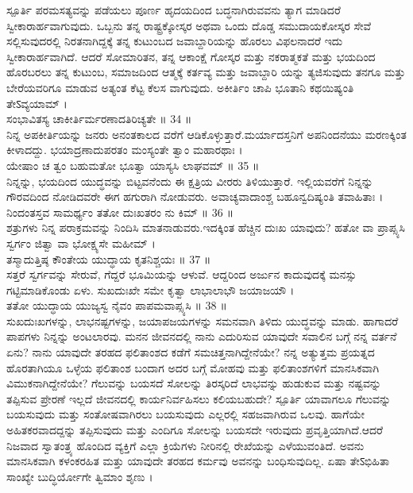  ಸ್ಪೂರ್ತಿ 
 ಪರಮಸತ್ಯವನ್ನು ಪಡೆಯಲು ಪೂರ್ಣ ಹೃದಯದಿಂದ ಬದ್ಧನಾಗಿರುವವನು ತ್ಯಾಗ ಮಾಡಿದರೆ ಸ್ವೀಕಾರಾರ್ಹವಾಗುವುದು. ಒಬ್ಬನು ತನ್ನ ರಾಷ್ಟ್ರಕ್ಕೋಸ್ಕರ ಅಥವಾ ಒಂದು ದೊಡ್ಡ ಸಮುದಾಯಕೋಸ್ಕರ ಸೇವೆ ಸಲ್ಲಿಸುವುದರಲ್ಲಿ ನಿರತನಾಗಿದ್ದಕ್ಕೆ ತನ್ನ ಕುಟುಂಬದ ಜವಾಬ್ದಾರಿಯನ್ನು ಹೊರಲು ವಿಫಲನಾದರೆ ಇದು ಸ್ವೀಕಾರಾರ್ಹವಾಗಿದೆ. ಆದರೆ ಸೋಮಾರಿತನ, ತನ್ನ ಆಕಾಂಕ್ಷೆ ಗೋಸ್ಕರ ಮತ್ತು ನಕರಾತ್ಮಕತೆ ಮತ್ತು ಭಯದಿಂದ ಹೊರಬರಲು ತನ್ನ ಕುಟುಂಬ, ಸಮಾಜದಿಂದ ಆತ್ಮಕ್ಕೆ ಕರ್ತವ್ಯ ಮತ್ತು ಜವಾಬ್ದಾರಿ ಯನ್ನು ತ್ಯಜಿಸುವುದು ತನಗೂ ಮತ್ತು ಬೇರೆಯವರಿಗೂ ಮಾಡುವ ಅತ್ಯಂತ ಕೆಟ್ಟ ಕೆಲಸ ವಾಗುವುದು.
ಅಕೀರ್ತಿಂ ಚಾಪಿ ಭೂತಾನಿ ಕಥಯಿಷ್ಯಂತಿ ತೇऽವ್ಯಯಾಮ್ ।\\
ಸಂಭಾವಿತಸ್ಯ ಚಾಕೀರ್ತಿರ್ಮರಣಾದತಿರಿಚ್ಯತೇ ॥ 34 ॥\\
 ನಿನ್ನ ಅಪಕೀರ್ತಿಯನ್ನು ಜನರು ಅನಂತಕಾಲದ ವರೆಗೆ ಆಡಿಕೊಳ್ಳುತ್ತಾರೆ.ಮರ್ಯಾದಸ್ತನಿಗೆ ಅಪನಿಂದನೆಯು ಮರಣಕ್ಕಿಂತ ಕೀಳಾದದ್ದು.
ಭಯಾದ್ರಣಾದುಪರತಂ ಮಂಸ್ಯಂತೇ ತ್ವಾಂ ಮಹಾರಥಾಃ ।\\
ಯೇಷಾಂ ಚ ತ್ವಂ ಬಹುಮತೋ ಭೂತ್ವಾ ಯಾಸ್ಯಸಿ ಲಾಘವಮ್ ॥ 35 ॥\\
 ನಿನ್ನನ್ನು, ಭಯದಿಂದ ಯುದ್ಧವನ್ನು ಬಿಟ್ಟವನೆಂದು ಈ ಕ್ಷತ್ರಿಯ ವೀರರು ತಿಳಿಯುತ್ತಾರೆ. ಇಲ್ಲಿಯವರೆಗೆ ನಿನ್ನನ್ನು ಗೌರವದಿಂದ ನೋಡಿದವರೇ ಈಗ ಹಗುರಾಗಿ ನೋಡುವರು.
ಅವಾಚ್ಯವಾದಾಂಶ್ಚ ಬಹೂನ್ವದಿಷ್ಯಂತಿ ತವಾಹಿತಾಃ ।\\
ನಿಂದಂತಸ್ತವ ಸಾಮರ್ಥ್ಯಂ ತತೋ ದುಃಖತರಂ ನು ಕಿಮ್ ॥ 36 ॥\\
 ಶತ್ರುಗಳು ನಿನ್ನ ಪರಾಕ್ರಮವನ್ನು ನಿಂದಿಸಿ ಮಾತನಾಡುವರು.ಇದಕ್ಕಿಂತ ಹೆಚ್ಚಿನ ದುಃಖ ಯಾವುದು?
ಹತೋ ವಾ ಪ್ರಾಪ್ಸ್ಯಸಿ ಸ್ವರ್ಗಂ ಜಿತ್ವಾ ವಾ ಭೋಕ್ಷ್ಯಸೇ ಮಹೀಮ್ ।\\
ತಸ್ಮಾದುತ್ತಿಷ್ಠ ಕೌಂತೇಯ ಯುದ್ಧಾಯ ಕೃತನಿಶ್ಚಯಃ ॥ 37 ॥\\
 ಸತ್ತರೆ ಸ್ವರ್ಗವನ್ನು ಸೇರುವೆ, ಗೆದ್ದರೆ ಭೂಮಿಯನ್ನು ಆಳುವೆ. ಆದ್ದರಿಂದ ಅರ್ಜುನ ಕಾದುವುದಕ್ಕೆ ಮನಸ್ಸು ಗಟ್ಟಿಮಾಡಿಕೊಂಡು ಏಳು.
ಸುಖದುಃಖೇ ಸಮೇ ಕೃತ್ವಾ ಲಾಭಾಲಾಭೌ ಜಯಾಜಯೌ ।\\
ತತೋ ಯುದ್ಧಾಯ ಯುಜ್ಯಸ್ವ ನೈವಂ ಪಾಪಮವಾಪ್ಸ್ಯಸಿ ॥ 38 ॥\\
 ಸುಖದುಃಖಗಳನ್ನು, ಲಾಭನಷ್ಟಗಳನ್ನು, ಜಯಾಪಜಯಗಳನ್ನು ಸಮನವಾಗಿ ತಿಳಿದು ಯುದ್ಧವನ್ನು ಮಾಡು. ಹಾಗಾದರೆ ಪಾಪಗಳು ನಿನ್ನನ್ನು ಅಂಟಲಾರವು.
ಮನನ
 ಜೀವನದಲ್ಲಿ ನಾನು ಎದುರಿಸುವ ಯಾವುದೇ ಸವಾಲಿನ ಬಗ್ಗೆ ನನ್ನ ವರ್ತನೆ ಏನು? ನಾನು ಯಾವುದೇ ತರಹದ ಫಲಿತಾಂಶದ ಕಡೆಗೆ ಸಮಚಿತ್ತನಾಗಿದ್ದೇನೆಯೇ? ನನ್ನ ಅತ್ಯುತ್ತಮ ಪ್ರಯತ್ನದ ಹೊರತಾಗಿಯೂ ಒಳ್ಳೆಯ ಫಲಿತಾಂಶ ಬಂದಾಗ ಅದರ ಬಗ್ಗೆ ಮೋಹವು ಮತ್ತು ಫಲಿತಾಂಶಗಳಿಗೆ ಮಾನಸಿಕವಾಗಿ ವಿಮುಕನಾಗಿದ್ದೇನೆಯೇ? ಗೆಲುವನ್ನು ಬಯಸದೆ ಸೋಲನ್ನು ತಿರಸ್ಕರಿದೆ ಲಾಭವನ್ನು ಹುಡುಕುವ ಮತ್ತು ನಷ್ಟವನ್ನು ತಪ್ಪಿಸುವ ಪ್ರೇರಣೆ ಇಲ್ಲದೆ ಜೀವನದಲ್ಲಿ  ಕಾರ್ಯನಿರ್ವಹಿಸಲು ಕಲಿಯಬಹುದೇ?
 ಸ್ಪೂರ್ತಿ 
 ಯಾವಾಗಲೂ ಗೆಲುವನ್ನು ಬಯಸುವುದು ಮತ್ತು ಸಂತೋಷವಾಗಿರಲು ಬಯಸುವುದು ಎಲ್ಲರಲ್ಲಿ ಸಹಜವಾಗಿರುವ ಒಲವು. ಹಾಗೆಯೇ ಅಹಿತಕರವಾದದ್ದನ್ನು ತಪ್ಪಿಸುವುದು ಮತ್ತು ಎಂದಿಗೂ ಸೋಲನ್ನು ಬಯಸದೇ ಇರುವುದು ಪ್ರವೃತ್ತಿಯಾಗಿದೆ.ಆದರೆ ನಿಜವಾದ ಸ್ವಾತಂತ್ರ್ಯ ಹೊಂದಿದ ವ್ಯಕ್ತಿಗೆ ಎಲ್ಲಾ ಕ್ರಿಯೆಗಳು ನೀರಿನಲ್ಲಿ ರೇಖೆಯನ್ನು ಎಳೆಯುವಂತಿದೆ. ಅವನು ಮಾನಸಿಕವಾಗಿ ಕಳಂಕರಹಿತ ಮತ್ತು ಯಾವುದೇ ತರಹದ ಕರ್ಮವು ಅವನನ್ನು ಬಂಧಿಸುವುದಿಲ್ಲ.
ಏಷಾ ತೇऽಭಿಹಿತಾ ಸಾಂಖ್ಯೇ ಬುದ್ಧಿರ್ಯೋಗೇ ತ್ವಿಮಾಂ ಶೃಣು ।\\
